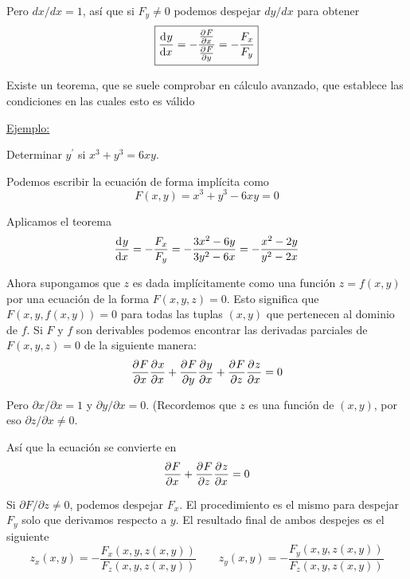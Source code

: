 \documentclass[12pt]{article}
\begin{document}
Pero $ dx/dx=1 $, así que si $ F_{y} \neq 0 $ podemos despejar $ dy/dx $ para obtener
\begin{equation}
\boxed{
  \dv[]{y}{x}=-\frac{\pdv[]{F}{x}}{\pdv[]{F}{y}}=-\frac{F_{x}}{F_{y}}
} 
\label{eq:derivacion-implicita}
\end{equation}

Existe un teorema, que se suele comprobar en cálculo avanzado, que establece las condiciones en las cuales esto es válido

\vspace{0.2cm}
\vspace{0.2cm}

\underline{Ejemplo:}

Determinar $ y^{\prime} $ si $ x^3 + y^3 = 6xy $.

Podemos escribir la ecuación de forma implícita como 
\[
	F(x,y) = x^3 + y^3 - 6xy =0
\]

Aplicamos el teorema
\[
\dv[]{y}{x} = -\frac{F_{x}}{F_{y}} = -\frac{3x^2-6y}{3y^2-6x}=-\frac{x^2-2y}{y^2-2x}
\]

Ahora supongamos que $ z $ es dada implícitamente como una función $ z=f(x,y) $ por una ecuación de la forma $ F(x,y,z)=0 $. Esto significa que $ F(x,y,f(x,y))=0 $ para todas las tuplas $ (x,y) $ que pertenecen al dominio de $ f $. Si $ F $ y $ f $ son derivables podemos encontrar las derivadas parciales de $ F(x,y,z)=0 $ de la siguiente manera:
\[
\pdv[]{F}{x}\pdv[]{x}{x} + \pdv[]{F}{y}\pdv[]{y}{x} + \pdv[]{F}{z}\pdv[]{z}{x} = 0
\]

Pero $ \partial x/\partial x = 1 $ y $ \partial y/\partial x = 0 $. (Recordemos que $ z $ es una función de $ (x,y) $, por eso $ \partial z/\partial x \neq 0 $.

Así que la ecuación se convierte en 
\[
\pdv[]{F}{x} + \pdv[]{F}{z}\pdv[]{z}{x} = 0
\]

Si $ \partial F/\partial z \neq 0 $, podemos despejar $ F_{x} $. El procedimiento es el mismo para despejar $ F_{y} $ solo que derivamos respecto a $ y $. El resultado final de ambos despejes es el siguiente
\begin{equation}
z_{x}(x,y)=-\frac{F_{x}(x,y,z(x,y))}{F_{z}(x,y,z(x,y))} \qquad z_{y}(x,y)=-\frac{F_{y}(x,y,z(x,y))}{F_{z}(x,y,z(x,y))} 
\label{eq:derivacion-implicita-2}
\end{equation}
\end{document}
